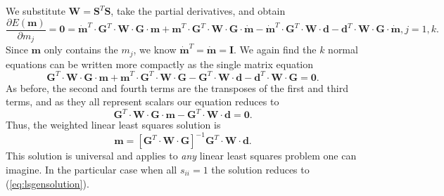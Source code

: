 We substitute $\mathbf{W = S}^T\mathbf{S}$, take the partial derivatives, and obtain
\begin{equation}
\frac{\partial E(\mathbf{m})}{\partial m_j }
= \mathbf{  0 =  \dot{m}}^T \cdot \mathbf{G}^T \cdot \mathbf{W  \cdot G \cdot  m + m}^T \cdot \mathbf{G}^T  \cdot \mathbf{W  \cdot G  \cdot \dot{m} - \dot{m}}^T \cdot \mathbf{G}^T \cdot \mathbf{W  \cdot  d - d}^T \cdot \mathbf{W  \cdot G  \cdot \dot{m}}, j = 1,k.
\end{equation}	 
Since $\mathbf{m}$ only contains the $m_j$, we know $\mathbf{\dot{m}}^T = \mathbf{\dot{m} = I}$. We again find the $k$ normal equations can be written more compactly as the single matrix equation
\begin{equation}
\mathbf{G}^T \cdot \mathbf{W  \cdot G \cdot  m + m}^T \cdot \mathbf{G}^T  \cdot \mathbf{W  \cdot G  -  G}^T \cdot \mathbf{W  \cdot  d - d}^T \cdot \mathbf{W  \cdot G = 0}.
\end{equation}
As before, the second and fourth terms are the transposes of the first and third terms, and as they all represent scalars our equation reduces to
\begin{equation}
\mathbf{G}^T \cdot \mathbf{W \cdot G \cdot m - G}^T \cdot \mathbf{W \cdot d = 0}.
\end{equation}	 
Thus, the weighted linear least squares solution is
\begin{equation}
\mathbf{m} = \left [ \mathbf{G}^T \cdot \mathbf{W \cdot G} \right ] ^{-1} \mathbf{G}^T \cdot \mathbf{W \cdot d}.
\label{eq:weightedLSgeneral}
\end{equation}
This solution is universal and applies to \emph{any} linear least squares problem one can imagine.
In the particular case when all $s_{ii} = 1$ the solution reduces to (\ref{eq:lsgensolution}).
